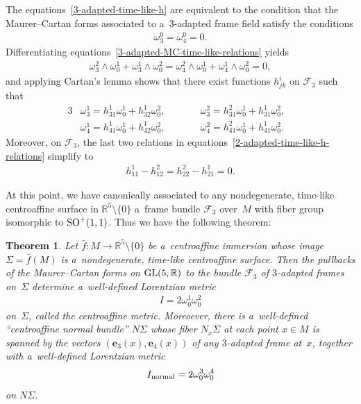 \documentclass[10pt,a4paper]{amsart}
\numberwithin{equation}{section}
\newtheorem{teo}{Theorem}[section]
\theoremstyle{definition}
\begin{document}
The equations~\eqref{3-adapted-time-like-h} are equivalent to the condition that the Maurer--Cartan forms associated to
a~3-adapted frame f\/ield satisfy the conditions
\begin{gather}
\omega^0_3 = \omega^0_4 = 0.
\label{3-adapted-MC-time-like-relations}
\end{gather}
Dif\/ferentiating equations~\eqref{3-adapted-MC-time-like-relations} yields
\begin{gather*}
\omega^2_3 \wedge \omega^1_0 + \omega^1_3 \wedge \omega^2_0 = \omega^2_4 \wedge \omega^1_0 + \omega^1_4 \wedge
\omega^2_0 = 0,
\end{gather*}
and applying Cartan's lemma shows that there exist functions $h^i_{jk}$ on $\mathcal{F}_3$ such that
\begin{alignat*}{3}
& \omega^1_3=h^1_{31}\omega^1_0 + h^1_{32}\omega^2_0,
\qquad&&
\omega^2_3=h^2_{31}\omega^1_0 + h^1_{31}\omega^2_0,&
\\
& \omega^1_4=h^1_{41}\omega^1_0 + h^1_{42}\omega^2_0,
\qquad&&
\omega^2_4=h^2_{41}\omega^1_0 + h^1_{41}\omega^2_0.&
\end{alignat*}
Moreover, on $\mathcal{F}_3$, the last two relations in equations~\eqref{2-adapted-time-like-h-relations} simplify to
\begin{gather*}
h^1_{11} - h^2_{12} = h^2_{22} - h^1_{21} = 0.
\end{gather*}

At this point, we have canonically associated to any nondegenerate, time-like centroaf\/f\/ine surface in $\mathbb{R}^5
\setminus \{0\}$ a~frame bundle $\mathcal{F}_3$ over~$M$ with f\/iber group isomorphic to ${\rm SO}^+(1,1)$.
Thus we have the following theorem:

\begin{teo}
\label{time-like-thm}
Let $\bar{f}:M \to \mathbb{R}^5 \setminus\{0\}$ be a~centroaffine immersion whose image $\Sigma = \bar{f}(M)$ is
a~nondegenerate, time-like centroaffine surface.
Then the pullbacks of the Maurer--Cartan forms on ${\rm GL}(5,\mathbb{R})$ to the bundle $\mathcal{F}_3$ of $3$-adapted
frames on~$\Sigma$ determine a~well-defined Lorentzian metric
\begin{gather*}
I = 2   \omega^1_0  \omega^2_0
\end{gather*}
on~$\Sigma$, called the   centroaffine metric.
Moreoever, there is a~well-defined ``centroaffine normal bundle'' $N\Sigma$ whose fiber $N_x\Sigma$ at each point $x \in M$
is spanned by the vectors $(\mathbf{e}_3(x), \mathbf{e}_4(x))$ of any $3$-adapted frame at~$x$, together with a~well-defined Lorentzian metric
\begin{gather*}
I_{\rm normal} = 2\omega^3_0 \omega^4_0
\end{gather*}
on $N\Sigma$.
\end{teo}
\end{document}
